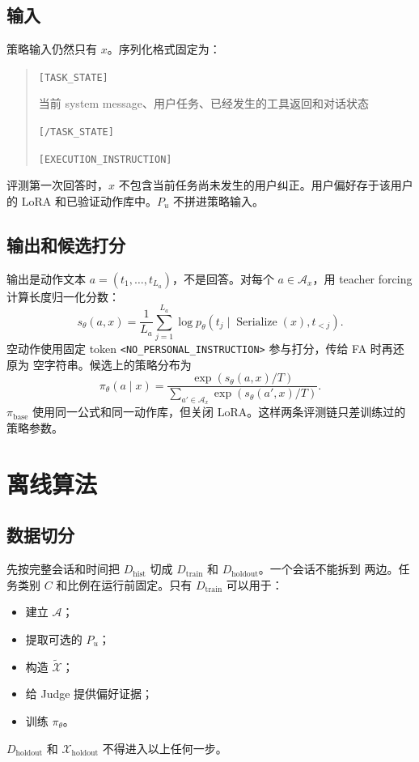 \documentclass[11pt,UTF8,fontset=fandol]{ctexart}
\newcommand{\Dhist}{D_{\mathrm{hist}}}
\newcommand{\Dtrain}{D_{\mathrm{train}}}
\newcommand{\Dholdout}{D_{\mathrm{holdout}}}
\newcommand{\Xholdout}{\mathcal X_{\mathrm{holdout}}}
\newcommand{\Xsim}{\widetilde{\mathcal X}}
\newcommand{\policy}{\pi_{\theta}}
\newcommand{\basepolicy}{\pi_{\mathrm{base}}}
\begin{document}
\subsection{输入}

策略输入仍然只有 \(x\)。序列化格式固定为：
\begin{quote}
\texttt{[TASK\_STATE]}\par
当前 system message、用户任务、已经发生的工具返回和对话状态\par
\texttt{[/TASK\_STATE]}\par
\texttt{[EXECUTION\_INSTRUCTION]}
\end{quote}
评测第一次回答时，\(x\) 不包含当前任务尚未发生的用户纠正。用户偏好存于该用户的 LoRA
和已验证动作库中。\(P_u\) 不拼进策略输入。

\subsection{输出和候选打分}

输出是动作文本 \(a=(t_1,\ldots,t_{L_a})\)，不是回答。对每个
\(a\in\mathcal A_x\)，用 teacher forcing 计算长度归一化分数：
\begin{equation}
  s_{\theta}(a,x)
  =
  \frac{1}{L_a}
  \sum_{j=1}^{L_a}
  \log p_{\theta}
  \left(t_j\mid
    \operatorname{Serialize}(x),t_{<j}\right).
  \label{eq:sequence-score}
\end{equation}
空动作使用固定 token \texttt{<NO\_PERSONAL\_INSTRUCTION>} 参与打分，传给 FA 时再还原为
空字符串。候选上的策略分布为
\begin{equation}
  \policy(a\mid x)
  =
  \frac{\exp(s_{\theta}(a,x)/T)}
       {\sum_{a'\in\mathcal A_x}
        \exp(s_{\theta}(a',x)/T)}.
  \label{eq:policy}
\end{equation}
\(\basepolicy\) 使用同一公式和同一动作库，但关闭 LoRA。这样两条评测链只差训练过的
策略参数。

\section{离线算法}

\subsection{数据切分}

先按完整会话和时间把 \(\Dhist\) 切成 \(\Dtrain\) 和 \(\Dholdout\)。一个会话不能拆到
两边。任务类别 \(C\) 和比例在运行前固定。只有 \(\Dtrain\) 可以用于：
\begin{itemize}
  \item 建立 \(\mathcal A\)；
  \item 提取可选的 \(P_u\)；
  \item 构造 \(\Xsim\)；
  \item 给 Judge 提供偏好证据；
  \item 训练 \(\policy\)。
\end{itemize}
\(\Dholdout\) 和 \(\Xholdout\) 不得进入以上任何一步。
\end{document}
